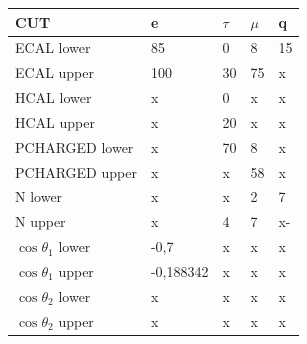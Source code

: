 \documentclass[]{article}
\begin{document}
\begin{tabular}{ |p{3cm}||p{2cm}|p{2cm}|p{2cm}|p{2cm}|  }
 \hline
 CUT & e & $\tau$ & $\mu$ & q \\
 \hline
 ECAL lower & 85 & 0 & 8 & 15 \\
 ECAL upper & 100 & 30 & 75 & x \\
 HCAL lower & x & 0 & x & x \\
 HCAL upper & x & 20 & x & x \\
 PCHARGED lower & x & 70 & 8 & x \\
 PCHARGED upper & x & x & 58 & x \\
 N lower & x & x & 2 & 7 \\
 N upper & x & 4 & 7 &x- \\
 $\cos\theta_1$ lower & -0,7 & x & x & x \\
 $\cos\theta_1$ upper & -0,188342 & x & x & x \\
 $\cos\theta_2$ lower & x & x & x & x \\
 $\cos\theta_2$ upper & x & x & x & x \\
 \hline
\end{tabular}
\newpage
\end{document}
